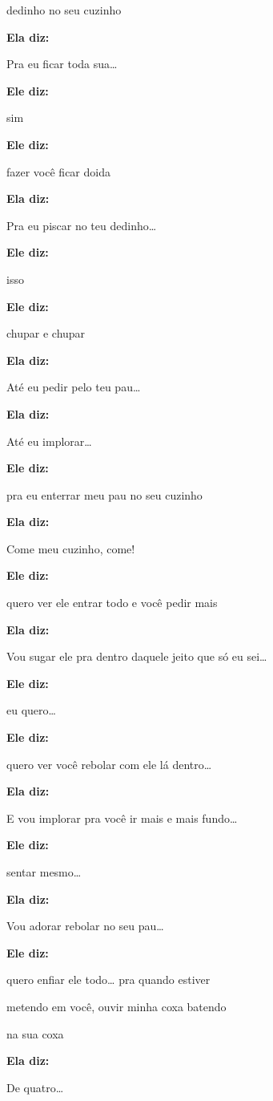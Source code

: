 dedinho no seu cuzinho

\textbf{Ela diz:}

Pra eu ficar toda sua…

\textbf{Ele diz:}

sim

\textbf{Ele diz:}

fazer você ficar doida

\textbf{Ela diz:}

Pra eu piscar no teu dedinho…

\textbf{Ele diz:}

isso

\textbf{Ele diz:}

chupar e chupar

\textbf{Ela diz:}

Até eu pedir pelo teu pau…

\textbf{Ela diz:}

Até eu implorar…

\textbf{Ele diz:}

pra eu enterrar meu pau no seu cuzinho

\textbf{Ela diz:}

Come meu cuzinho, come!

\textbf{Ele diz:}

quero ver ele entrar todo e você pedir mais

\textbf{Ela diz:}

Vou sugar ele pra dentro daquele jeito que só eu sei…

\textbf{Ele diz:}

eu quero…

\textbf{Ele diz:}

quero ver você rebolar com ele lá dentro…

\textbf{Ela diz:}

E vou implorar pra você ir mais e mais fundo…

\textbf{Ele diz:}

sentar mesmo…

\textbf{Ela diz:}

Vou adorar rebolar no seu pau…

\textbf{Ele diz:}

quero enfiar ele todo… pra quando estiver

metendo em você, ouvir minha coxa batendo

na sua coxa

\textbf{Ela diz:}

De quatro…

